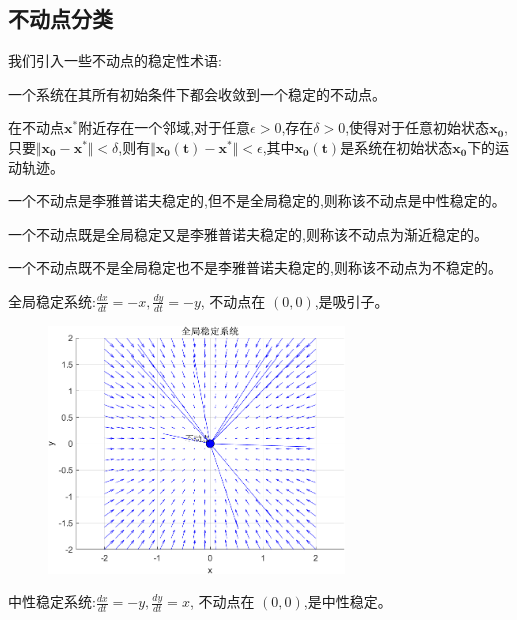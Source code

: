 \subsection*{不动点分类}
我们引入一些不动点的稳定性术语:
\begin{defn}

    一个系统在其所有初始条件下都会收敛到一个稳定的不动点。
\end{defn}
\begin{defn}

    在不动点$\mathbf{x^*}$附近存在一个邻域,对于任意$\epsilon>0$,存在$\delta>0$,使得对于任意初始状态$\mathbf{x_0}$,只要$\Vert \mathbf{x_0}-\mathbf{x^*}\Vert<\delta$,则有$\Vert \mathbf{x_0(t)}-\mathbf{x^*}\Vert<\epsilon$,其中$\mathbf{x_0(t)}$是系统在初始状态$\mathbf{x_0}$下的运动轨迹。
\end{defn}
\begin{defn}

    一个不动点是李雅普诺夫稳定的,但不是全局稳定的,则称该不动点是中性稳定的。
\end{defn}
\begin{defn}

    一个不动点既是全局稳定又是李雅普诺夫稳定的,则称该不动点为渐近稳定的。
\end{defn}
\begin{defn}

    一个不动点既不是全局稳定也不是李雅普诺夫稳定的,则称该不动点为不稳定的。
\end{defn}

全局稳定系统:$\frac{dx}{dt}=-x,\frac{dy}{dt}=-y$, 不动点在 $(0, 0)$,是吸引子。
\begin{figure}[H]
    \centering
    \includegraphics[width=0.7\textwidth]{Img/fix5.png}
    \label{fig:global_stable}
\end{figure}
中性稳定系统:$\frac{dx}{dt}=-y,\frac{dy}{dt}=x$, 不动点在 $(0, 0)$,是中性稳定。

